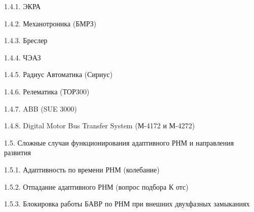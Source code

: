 \noindent\hspace*{3.0em}1.4.1. ЭКРА\par\vspace{0.5mm}
\noindent\hspace*{3.0em}1.4.2. Механотроника (БМРЗ)\par\vspace{0.5mm}
\noindent\hspace*{3.0em}1.4.3. Бреслер\par\vspace{0.5mm}
\noindent\hspace*{3.0em}1.4.4. ЧЭАЗ\par\vspace{0.5mm}
\noindent\hspace*{3.0em}1.4.5. Радиус Автоматика (Сириус)\par\vspace{0.5mm}
\noindent\hspace*{3.0em}1.4.6. Релематика (ТОР300)\par\vspace{0.5mm}
\noindent\hspace*{3.0em}1.4.7. ABB (SUE 3000)\par\vspace{0.5mm}
\noindent\hspace*{3.0em}1.4.8. Digital Motor Bus Transfer System (М-4172 и М-4272)\par\vspace{0.5mm}
\noindent\hspace*{1.5em}1.5. Сложные случаи функционирования адаптивного РНМ и направления развития\par\vspace{0.5mm}
\noindent\hspace*{3.0em}1.5.1. Адаптивность по времени РНМ (колебание)\par\vspace{0.5mm}
\noindent\hspace*{3.0em}1.5.2. Отпадание адаптивного РНМ (вопрос подбора К отс)\par\vspace{0.5mm}
\noindent\hspace*{3.0em}1.5.3. Блокировка работы БАВР по РНМ при внешних двухфазных замыканиях\par\vspace{0.5mm}
